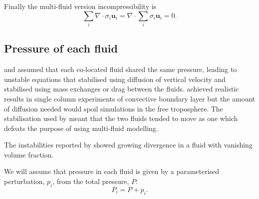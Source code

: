 \documentclass[draft]{agujournal2019}
\begin{document}
Finally the multi-fluid version incompressibility is
\begin{equation}
\sum_{i}\nabla\cdot\sigma_{i}\mathbf{u}_{i}  = \nabla\cdot\sum_{i}\sigma_{i}\mathbf{u}_{i}=0.
\label{eq:divFree}
\end{equation}

\subsection{Pressure of each fluid \label{subsec:fluidPressure}}

 and  assumed that each co-located fluid
shared the same pressure, leading to unstable equations that 
stabilised using diffusion of vertical velocity and 
stabilised using mass exchanges or drag between the fluids. 
achieved realistic results in single column experiments of convective
boundary layer but the amount of diffusion needed would spoil simulations
in the free troposphere. The stabilisation used by  meant
that the two fluids tended to move as one which defeats the purpose
of using multi-fluid modelling. 

The instabilities reported by  showed growing divergence
in a fluid with vanishing volume fraction. 

We will assume that pressure in each fluid is given by a parameterised
perturbation, $p_{i}$, from the total pressure, $P$:
\begin{equation}
P_{i}=P+p_{i}.
\end{equation}
  

\subsubsection{}
\end{document}
